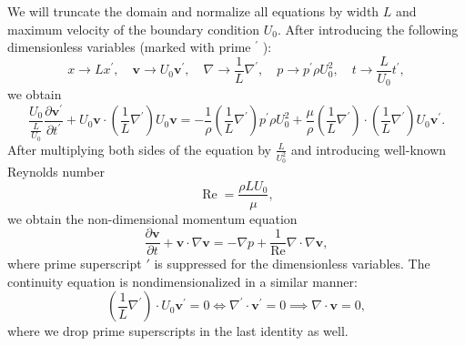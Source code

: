 \documentclass{article}
\numberwithin{equation}{section}
\begin{document}
We will truncate the domain and normalize all equations by width $L$ and maximum velocity of the boundary condition $U_0$. After introducing the following dimensionless variables (marked with prime ${ }^{\prime}$ ):
\begin{equation*}
	x\to Lx^{\prime},  \quad 
	\boldsymbol{v}\to U_0\boldsymbol{v}^{\prime}, \quad 
	\nabla\to \frac{1}{L}\nabla^{\prime}, \quad 
	p\to p^{\prime} \rho U_0^2, \quad 
	t\to \frac{L}{U_0}t^{\prime},
\end{equation*}
we obtain
\begin{equation*}
	\frac{U_0}{\frac{L}{U_0}} \frac{\partial \boldsymbol{v}^{\prime}}{\partial t^{\prime}}+U_0\boldsymbol{v}\cdot\left(\frac{1}{L} \nabla^{\prime}\right) U_0\boldsymbol{v}=-\frac{1}{\rho}\left(\frac{1}{L} \nabla^{\prime}\right){p^{\prime}\rho U^2_0}+\frac{\mu}{\rho} \left(\frac{1}{L} \nabla^{\prime}\right) \cdot\left(\frac{1}{L} \nabla^{\prime}\right) U_0\boldsymbol{v}^{\prime}.
\end{equation*}
After multiplying both sides of the equation by $\frac{L}{U_0^2}$ and introducing well-known Reynolds number 
\begin{equation*}
\operatorname{Re}=\frac{\rho L U_0}{\mu},
\end{equation*}
we obtain the non-dimensional momentum equation
\begin{equation*}
	\frac{\partial \boldsymbol{v}}{\partial t} + \boldsymbol{v} \cdot \nabla \boldsymbol{v} = -\nabla p + \frac{1}{\operatorname{Re}} \nabla \cdot \nabla \boldsymbol{v},
\end{equation*}
where prime superscript $\prime$ is suppressed for the dimensionless variables. The continuity equation is nondimensionalized in a similar manner:
\begin{equation*}
	\left(\frac{1}{L} \nabla^{\prime}\right) \cdot U_0\boldsymbol{v}^{\prime}=0\iff\nabla^{\prime} \cdot\boldsymbol{v}^{\prime}=0\implies\nabla \cdot\boldsymbol{v}=0,
\end{equation*}
where we drop prime superscripts in the last identity as well.

\pagebreak
\end{document}
